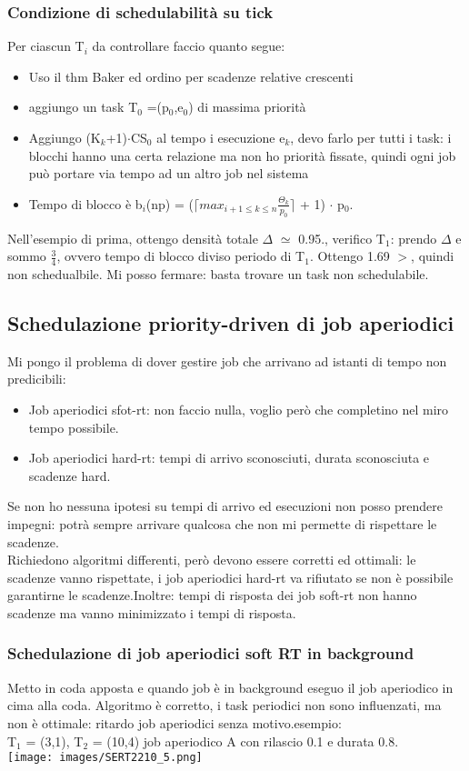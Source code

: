 \documentclass[18px]{article}
\begin{document}
\subsubsection{Condizione di schedulabilità su tick}
Per ciascun T$_{i}$ da controllare faccio quanto segue:
\begin{itemize}
\item Uso il thm Baker ed ordino per scadenze relative crescenti
\item aggiungo un task T$_{0}$ =(p$_{0}$,e$_{0}$) di massima priorità
\item Aggiungo (K$_{k}$+1)$\cdot$CS$_{0}$ al tempo i esecuzione e$_{k}$, devo farlo per tutti i task: i blocchi hanno una certa relazione ma non ho priorità fissate, quindi ogni job può portare via tempo ad un altro job nel sistema
\item Tempo di blocco è b$_{i}$(np) = ($\lceil max_{i+1 \leq k \leq n}\frac{\Theta_{k}}{p_{0}}\rceil$ + 1) $\cdot$ p$_{0}$.
\end{itemize}
Nell'esempio di prima, ottengo densità totale $\Delta$ $\simeq$ 0.95., verifico T$_{1}$: prendo $\Delta$ e sommo $\frac{3}{4}$, ovvero tempo di blocco diviso periodo di T$_{1}$. Ottengo 1.69 $>$, quindi non schedualbile. Mi posso fermare: basta trovare un task non schedulabile.
\subsection{Schedulazione priority-driven di job aperiodici}
Mi pongo il problema di dover gestire job che arrivano ad istanti di tempo non predicibili:
\begin{itemize}
\item Job aperiodici sfot-rt: non faccio nulla, voglio però che completino nel miro tempo possibile.
\item Job aperiodici hard-rt: tempi di arrivo sconosciuti, durata sconosciuta e scadenze hard.
\end{itemize}
Se non ho nessuna ipotesi su tempi di arrivo ed esecuzioni non posso prendere impegni: potrà sempre arrivare qualcosa che non mi permette di rispettare le scadenze.\\ Richiedono algoritmi differenti, però devono essere corretti ed ottimali: le scadenze vanno rispettate, i job aperiodici hard-rt va rifiutato se non è possibile garantirne le scadenze.Inoltre: tempi di risposta dei job soft-rt non hanno scadenze ma vanno minimizzato i tempi di risposta.
\subsubsection{Schedulazione di job aperiodici soft RT in background}
Metto in coda apposta e quando job è in background eseguo il job aperiodico in cima alla coda. Algoritmo è corretto, i task periodici non sono influenzati, ma non è ottimale: ritardo job aperiodici senza motivo.esempio:\\
T$_{1}$ = (3,1), T$_{2}$ = (10,4) job aperiodico A con rilascio 0.1 e durata 0.8.\\
\texttt{[image: images/SERT2210\_5.png]}\\
\end{document}
